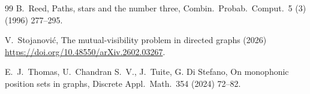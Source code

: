 \documentclass[a4paper,12pt]{article}
\theoremstyle{definition}
\begin{document}
\begin{thebibliography}{99}
		B.~Reed, 
		Paths, stars and the number three, 
		Combin.\ Probab.\ Comput.\ 5 (3)
		(1996) 277--295.
		
		V.~Stojanovi\'{c}, 
		The mutual-visibility problem in directed graphs (2026)
		\url{https://doi.org/10.48550/arXiv.2602.03267}.
		
		E.~J.~Thomas, U.~Chandran S.~V., J.~Tuite, G. Di Stefano, 
		On monophonic position sets in graphs, 
		Discrete Appl.\ Math.\ 354 (2024) 72--82.
		
		
	\end{thebibliography}
	
	
	
	
\end{document}
